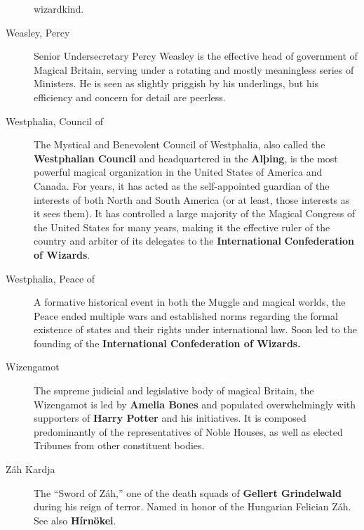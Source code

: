 \begin{description}
wizardkind.
\item[Weasley, Percy]
Senior Undersecretary Percy Weasley is the effective head of government
of Magical Britain, serving under a rotating and mostly meaningless
series of Ministers. He is seen as slightly priggish by his underlings,
but his efficiency and concern for detail are peerless.
\item[Westphalia, Council of]
The Mystical and Benevolent Council of Westphalia, also called the
\textbf{Westphalian Council} and headquartered in the \textbf{Alþing},
is the most powerful magical organization in the United States of
America and Canada. For years, it has acted as the self-appointed
guardian of the interests of both North and South America (or at least,
those interests as it sees them). It has controlled a large majority of
the Magical Congress of the United States for many years, making it the
effective ruler of the country and arbiter of its delegates to the
\textbf{International} \textbf{Confederation of Wizards}.
\item[Westphalia, Peace of]
A formative historical event in both the Muggle and magical worlds, the
Peace ended multiple wars and established norms regarding the formal
existence of states and their rights under international law. Soon led
to the founding of the \textbf{International Confederation of Wizards.}
\item[Wizengamot]
The supreme judicial and legislative body of magical Britain, the
Wizengamot is led by \textbf{Amelia Bones} and populated overwhelmingly
with supporters of \textbf{Harry Potter} and his initiatives. It is
composed predominantly of the representatives of Noble Houses, as well
as elected Tribunes from other constituent bodies.
\item[Záh Kardja]
The ``Sword of Záh,'' one of the death squads of \textbf{Gellert
Grindelwald} during his reign of terror. Named in honor of the Hungarian
Felician Záh. See also \textbf{Hírnökei}.
\end{description}
